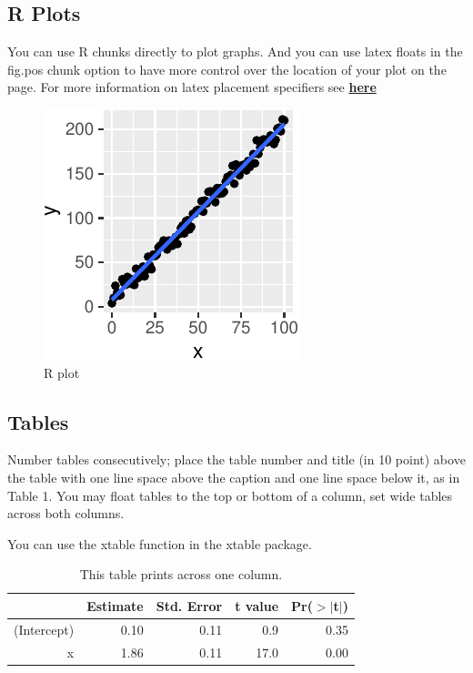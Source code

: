 \documentclass[10pt, letterpaper]{article}
\newenvironment{CodeChunk}{}{}
\begin{document}
\hypertarget{r-plots}{%
\subsection{R Plots}\label{r-plots}}

You can use R chunks directly to plot graphs. And you can use latex
floats in the fig.pos chunk option to have more control over the
location of your plot on the page. For more information on latex
placement specifiers see
\textbf{\href{https://en.wikibooks.org/wiki/LaTeX/Floats,_Figures_and_Captions}{here}}

\begin{CodeChunk}
\begin{figure}[H]

{\centering \includegraphics{figs/plot-1} 

}

\caption[R plot]{R plot}\label{fig:plot}
\end{figure}
\end{CodeChunk}

\hypertarget{tables}{%
\subsection{Tables}\label{tables}}

Number tables consecutively; place the table number and title (in 10
point) above the table with one line space above the caption and one
line space below it, as in Table 1. You may float tables to the top or
bottom of a column, set wide tables across both columns.

You can use the xtable function in the xtable package.

\begin{table}[H]
\centering
\begin{tabular}{rrrrr}
  \hline
 & Estimate & Std. Error & t value & Pr($>$$|$t$|$) \\ 
  \hline
(Intercept) & 0.10 & 0.11 & 0.9 & 0.35 \\ 
  x & 1.86 & 0.11 & 17.0 & 0.00 \\ 
   \hline
\end{tabular}
\caption{This table prints across one column.} 
\end{table}
\end{document}
